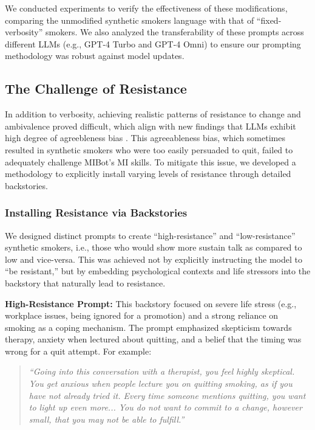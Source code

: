 We conducted experiments to verify the effectiveness of these modifications, comparing the unmodified synthetic smokers language with that of ``fixed-verbosity'' smokers. We also analyzed the transferability of these prompts across different LLMs (e.g., GPT-4 Turbo and GPT-4 Omni) to ensure our prompting methodology was robust against model updates.

\subsection{The Challenge of Resistance}
In addition to verbosity, achieving realistic patterns of resistance to change and ambivalence proved difficult, which align with new findings that LLMs exhibit high degree of agreebleness bias \cite{Salecha_2024}. This agreeableness bias, which sometimes resulted in synthetic smokers who were too easily persuaded to quit, failed to adequately challenge MIBot's MI skills. To mitigate this issue, we developed a methodology to explicitly install varying levels of resistance through detailed backstories.

\subsubsection*{Installing Resistance via Backstories}
We designed distinct prompts to create ``high-resistance'' and ``low-resistance'' synthetic smokers, i.e., those who would show more sustain talk as compared to low and vice-versa. This was achieved not by explicitly instructing the model to ``be resistant,'' but by embedding psychological contexts and life stressors into the backstory that naturally lead to resistance.

\textbf{High-Resistance Prompt:} This backstory focused on severe life stress (e.g., workplace issues, being ignored for a promotion) and a strong reliance on smoking as a coping mechanism. The prompt emphasized skepticism towards therapy, anxiety when lectured about quitting, and a belief that the timing was wrong for a quit attempt. For example:

\begin{quote}
\textit{``Going into this conversation with a therapist, you feel highly skeptical. You get anxious when people lecture you on quitting smoking, as if you have not already tried it. Every time someone mentions quitting, you want to light up even more... You do not want to commit to a change, however small, that you may not be able to fulfill.''}  
\end{quote}

